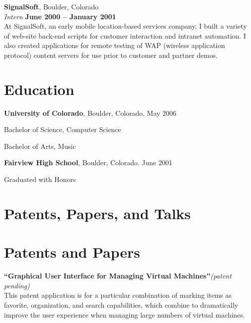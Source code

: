 \documentclass[margin,line]{resume}
\begin{document}
\begin{resume}
        {\bf SignalSoft}, Boulder, Colorado \vspace{2mm}\\\vspace{1mm}%
        {\sl Intern} \hfill {\bf June 2000 -- January 2001}\\
        At SignalSoft, an early mobile location-based services company, I built a
        variety of web-site back-end scripts for customer interaction and intranet
        automation. I also created applications for remote testing of WAP
        (wireless application protocol) content servers for use prior to customer
        and partner demos.
    \fi

    \section{\mysidestyle Education}

    {\bf University of Colorado}, Boulder, Colorado. May 2006 \vspace{2mm}%
    \begin{list2}
    \item[] Bachelor of Science, Computer Science
    \item[] Bachelor of Arts, Music
    \end{list2}
    \ifcv
        {\bf Fairview High School}, Boulder, Colorado. June 2001 \vspace{2mm}%
        \begin{list2}
        \item[] Graduated with Honors
        \end{list2}
    \fi

    \ifcv
        \section{\mysidestyle Patents, Papers, and Talks}
    \else
        \section{\mysidestyle Patents and Papers}
    \fi

    {\bf``Graphical User Interface for Managing Virtual Machines''}{\it (patent pending)} \vspace{2mm}\\
    This patent application is for a particular combination of marking
    items as favorite, organization, and search capabilities, which combine
    to dramatically improve the user experience when managing large numbers
    of virtual machines.


\end{resume}
\end{document}
